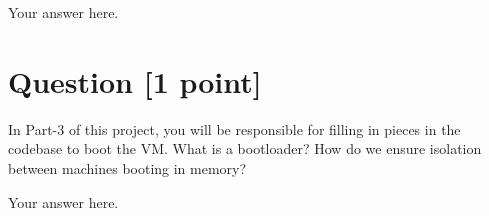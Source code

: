 \documentclass[11pt]{article}
\begin{document}
\begin{solution}
Your answer here.
\end{solution}


\section{Question [1 point]}

In Part-3 of this project, you will be responsible for filling in pieces in the codebase to boot the VM. What is a bootloader? How do we ensure isolation between machines booting in memory?

\begin{solution}
Your answer here.
\end{solution}
\end{document}
